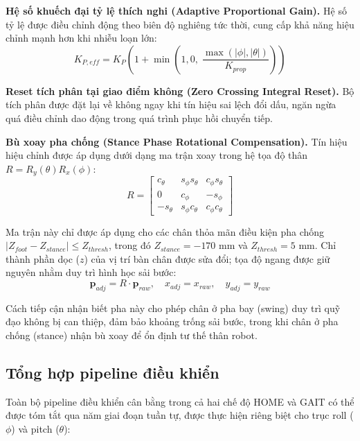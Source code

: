 \textbf{Hệ số khuếch đại tỷ lệ thích nghi (Adaptive Proportional Gain).}
Hệ số tỷ lệ được điều chỉnh động theo biên độ nghiêng tức thời, cung cấp khả năng hiệu chỉnh mạnh hơn khi nhiễu loạn lớn:
\begin{equation}
    K_{P,eff} = K_P \left(1 + \min\!\left(1{,}0, \;
    \frac{\max(|\phi|, |\theta|)}{K_{prop}}
    \right)\right)
\end{equation}

\textbf{Reset tích phân tại giao điểm không (Zero Crossing Integral Reset).}
Bộ tích phân được đặt lại về không ngay khi tín hiệu sai lệch đổi dấu, ngăn ngừa quá điều chỉnh dao động trong quá trình phục hồi chuyển tiếp.

\textbf{Bù xoay pha chống (Stance Phase Rotational Compensation).}
Tín hiệu hiệu chỉnh được áp dụng dưới dạng ma trận xoay trong hệ tọa độ thân $R = R_y(\theta) R_x(\phi)$:
\begin{equation}
    R = \begin{bmatrix}
    c_\theta & s_\phi s_\theta & c_\phi s_\theta \\
    0 & c_\phi & -s_\phi \\
    -s_\theta & s_\phi c_\theta & c_\phi c_\theta
    \end{bmatrix}
\end{equation}

Ma trận này chỉ được áp dụng cho các chân thỏa mãn điều kiện pha chống $|Z_{foot} - Z_{stance}| \leq Z_{thresh}$, trong đó $Z_{stance} = -170$ mm và $Z_{thresh} = 5$ mm. Chỉ thành phần dọc ($z$) của vị trí bàn chân được sửa đổi; tọa độ ngang được giữ nguyên nhằm duy trì hình học sải bước:
\begin{equation}
    \mathbf{p}_{adj} = R \cdot \mathbf{p}_{raw}, \quad
    x_{adj} = x_{raw}, \quad y_{adj} = y_{raw}
\end{equation}

Cách tiếp cận nhận biết pha này cho phép chân ở pha bay (swing) duy trì quỹ đạo không bị can thiệp, đảm bảo khoảng trống sải bước, trong khi chân ở pha chống (stance) nhận bù xoay để ổn định tư thế thân robot.

\subsection{Tổng hợp pipeline điều khiển}

Toàn bộ pipeline điều khiển cân bằng trong cả hai chế độ HOME và GAIT có thể được tóm tắt qua năm giai đoạn tuần tự, được thực hiện riêng biệt cho trục roll ($\phi$) và pitch ($\theta$):

